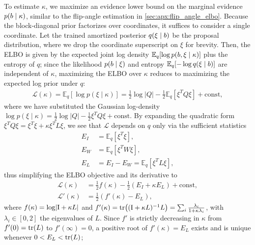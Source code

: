 To estimate $\kappa$, we maximize an evidence lower bound on the marginal evidence $p(b \mid \kappa)$, similar to the flip-angle estimation in \cref{sec:apx:flip_angle_elbo}.
Because the block-diagonal prior factorizes over coordinates, it suffices to consider a single coordinate.
Let the trained amortized posterior $q(\xi \mid b)$ be the proposal distribution, where we drop the coordinate superscript on $\xi$ for brevity.
Then, the \gls*{ELBO} is given by the expected joint log density $\mathbb{E}_{q}[\log p(b, \xi \mid \kappa)]$ plus the entropy of $q$;
since the likelihood $p(b \mid \xi)$ and entropy $\mathbb{E}_{q}[-\log q(\xi \mid b)]$ are independent of $\kappa$, maximizing the \gls*{ELBO} over $\kappa$ reduces to maximizing the expected log prior under $q$:
\begin{align}\label{eqn:apx:spatial_mstep_obj}
    \mathcal{L}(\kappa)
    =
    \mathbb{E}_{q}\!\left[ \log p(\xi \mid \kappa) \right]
    =
    \frac{1}{2} \log\lvert Q \rvert - \frac{1}{2} \mathbb{E}_{q}\!\left[ \xi^T Q \xi \right] + \mathrm{const},
\end{align}
where we have substituted the Gaussian log-density $\log p(\xi \mid \kappa) = \tfrac{1}{2} \log\lvert Q \rvert - \tfrac{1}{2} \xi^T Q \xi + \mathrm{const}$.
By expanding the quadratic form $\xi^T Q \xi = \xi^T \xi + \kappa \xi^T L \xi$, we see that $\mathcal{L}$ depends on $q$ only via the sufficient statistics
\begin{align}\label{eqn:apx:spatial_stats}
    E_I & = \mathbb{E}_{q}\!\left[ \xi^T \xi \right],                         \\
    E_W & = \mathbb{E}_{q}\!\left[ \xi^T W \xi \right], \nonumber             \\
    E_L & = E_I - E_W = \mathbb{E}_{q}\!\left[ \xi^T L \xi \right], \nonumber
\end{align}
thus simplifying the \gls*{ELBO} objective and its derivative to
\begin{align}\label{eqn:apx:spatial_mstep}
    \mathcal{L}(\kappa)  & = \frac{1}{2} f(\kappa) - \frac{1}{2}( E_I + \kappa E_L ) + \mathrm{const}, \\
    \mathcal{L}'(\kappa) & = \frac{1}{2}\left( f'(\kappa) - E_L \right), \nonumber
\end{align}
where $f(\kappa) = \log\lvert \mathrm{I} + \kappa L \rvert$ and $f'(\kappa) = \Tr{(\Id + \kappa L)^{-1} L} = \sum_i \frac{\lambda_i}{1 + \kappa \lambda_i}$, with $\lambda_i \in [0, 2]$ the eigenvalues of $L$.
Since $f'$ is strictly decreasing in $\kappa$ from $f'(0) = \Tr{L}$ to $f'(\infty) = 0$, a positive root of $f'(\kappa) = E_L$ exists and is unique whenever $0 < E_L < \Tr{L}$;
